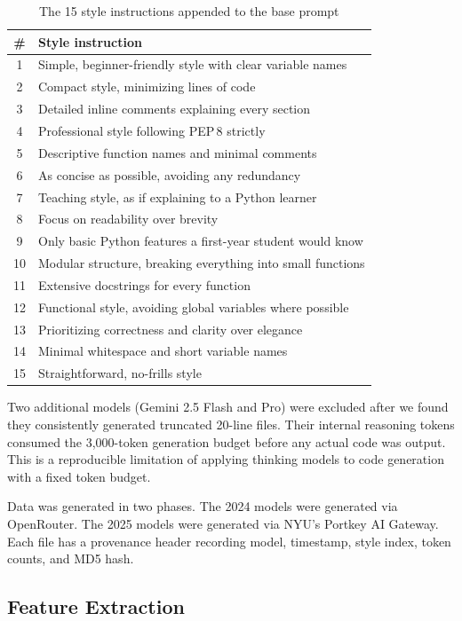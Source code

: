 \documentclass[sigconf]{acmart}
\begin{document}
\begin{table}[h]
\caption{The 15 style instructions appended to the base prompt}
\label{tab:styles}
\small
\begin{tabular}{cl}
\toprule
\# & Style instruction \\
\midrule
1  & Simple, beginner-friendly style with clear variable names \\
2  & Compact style, minimizing lines of code \\
3  & Detailed inline comments explaining every section \\
4  & Professional style following PEP\,8 strictly \\
5  & Descriptive function names and minimal comments \\
6  & As concise as possible, avoiding any redundancy \\
7  & Teaching style, as if explaining to a Python learner \\
8  & Focus on readability over brevity \\
9  & Only basic Python features a first-year student would know \\
10 & Modular structure, breaking everything into small functions \\
11 & Extensive docstrings for every function \\
12 & Functional style, avoiding global variables where possible \\
13 & Prioritizing correctness and clarity over elegance \\
14 & Minimal whitespace and short variable names \\
15 & Straightforward, no-frills style \\
\bottomrule
\end{tabular}
\end{table}

Two additional models (Gemini 2.5 Flash and Pro) were excluded after we found they consistently generated truncated 20-line files. Their internal reasoning tokens consumed the 3,000-token generation budget before any actual code was output. This is a reproducible limitation of applying thinking models to code generation with a fixed token budget.

Data was generated in two phases. The 2024 models were generated via OpenRouter. The 2025 models were generated via NYU's Portkey AI Gateway. Each file has a provenance header recording model, timestamp, style index, token counts, and MD5 hash.

\subsection{Feature Extraction}
\end{document}
